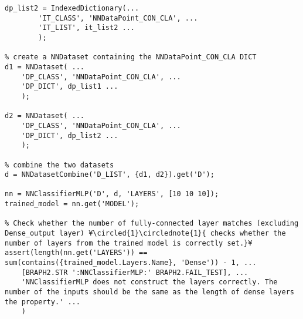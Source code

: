 \documentclass{tufte-handout}
\begin{document}
\begin{lstlisting}
dp_list2 = IndexedDictionary(...
        'IT_CLASS', 'NNDataPoint_CON_CLA', ...
        'IT_LIST', it_list2 ...
        );

% create a NNDataset containing the NNDataPoint_CON_CLA DICT
d1 = NNDataset( ...
    'DP_CLASS', 'NNDataPoint_CON_CLA', ...
    'DP_DICT', dp_list1 ...
    );

d2 = NNDataset( ...
    'DP_CLASS', 'NNDataPoint_CON_CLA', ...
    'DP_DICT', dp_list2 ...
    );

% combine the two datasets
d = NNDatasetCombine('D_LIST', {d1, d2}).get('D');

nn = NNClassifierMLP('D', d, 'LAYERS', [10 10 10]);
trained_model = nn.get('MODEL');

% Check whether the number of fully-connected layer matches (excluding Dense_output layer) ¥\circled{1}\circlednote{1}{ checks whether the number of layers from the trained model is correctly set.}¥
assert(length(nn.get('LAYERS')) == sum(contains({trained_model.Layers.Name}, 'Dense')) - 1, ...
    [BRAPH2.STR ':NNClassifierMLP:' BRAPH2.FAIL_TEST], ...
    'NNClassifierMLP does not construct the layers correctly. The number of the inputs should be the same as the length of dense layers the property.' ...
    )

\end{lstlisting}
\end{document}
